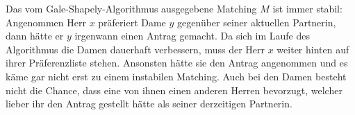 \noindent Das vom Gale-Shapely-Algorithmus ausgegebene Matching $M$ ist immer stabil: Angenommen Herr $x$ präferiert Dame $y$ gegenüber seiner aktuellen Partnerin, dann hätte er $y$ irgenwann einen Antrag gemacht. Da sich im Laufe des Algorithmus die Damen dauerhaft verbessern, muss der Herr $x$ weiter hinten auf ihrer Präferenzliste stehen. Ansonsten hätte sie den Antrag angenommen und es käme gar nicht erst zu einem instabilen Matching. Auch bei den Damen besteht nicht die Chance, dass eine von ihnen einen anderen Herren bevorzugt, welcher lieber ihr den Antrag gestellt hätte als seiner derzeitigen Partnerin.